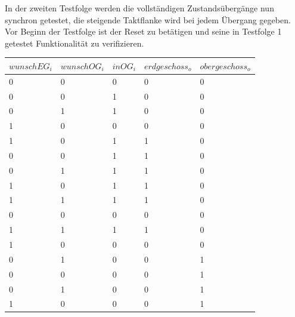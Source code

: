 \documentclass[a4paper,12pt,bibtotocnumbered]{scrartcl} %
\numberwithin{equation}{section} %
\begin{document}
In der zweiten Testfolge werden die vollständigen Zustandsübergänge nun synchron getestet, die steigende Taktflanke wird bei jedem Übergang gegeben.
Vor Beginn der Testfolge ist der Reset zu betätigen und seine in Testfolge 1 getestet Funktionalität zu verifizieren.
\begin{table}[H]
	\begin{tabular}{lllll}
		$wunschEG_i$ & $wunschOG_i$ & \multicolumn{1}{l|}{$inOG_i$} & $erdgeschoss_o$ & $obergeschoss_o$ \\ \hline
		0          & 0          & \multicolumn{1}{l|}{0}      & 0             & 0              \\
		0          & 0          & \multicolumn{1}{l|}{1}      & 0             & 0              \\
		0          & 1          & \multicolumn{1}{l|}{1}      & 0             & 0              \\
		1          & 0          & \multicolumn{1}{l|}{0}      & 0             & 0              \\ \hline
		1          & 0          & \multicolumn{1}{l|}{1}      & 1             & 0              \\
		0          & 0          & \multicolumn{1}{l|}{1}      & 1             & 0              \\
		0          & 1          & \multicolumn{1}{l|}{1}      & 1             & 0              \\
		1          & 0          & \multicolumn{1}{l|}{1}      & 1             & 0              \\
		1          & 1          & \multicolumn{1}{l|}{1}      & 1             & 0              \\ \hline
		0          & 0          & \multicolumn{1}{l|}{0}      & 0             & 0              \\ \hline
		1          & 1          & \multicolumn{1}{l|}{1}      & 1             & 0              \\ \hline
		1          & 0          & \multicolumn{1}{l|}{0}      & 0             & 0              \\ \hline
		0          & 1          & \multicolumn{1}{l|}{0}      & 0             & 1              \\
		0          & 0          & \multicolumn{1}{l|}{0}      & 0             & 1              \\
		0          & 1          & \multicolumn{1}{l|}{0}      & 0             & 1              \\
		1          & 0          & \multicolumn{1}{l|}{0}      & 0             & 1              \\

\end{tabular}
\end{table}
\end{document}
